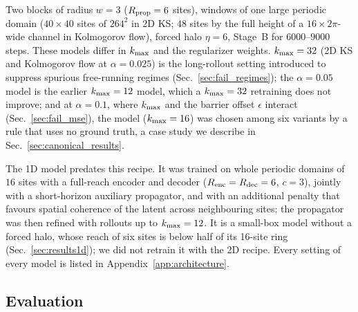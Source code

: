  Two blocks of radius $w=3$ ($R_{\mathrm{prop}}=6$ sites),
windows of one large periodic domain ($40\times40$ sites of $264^2$ in 2D
KS; $48$ sites by the full height of a $16\times2\pi$-wide channel in
Kolmogorov flow), forced halo $\eta=6$, Stage~B for $6000$--$9000$ steps.
These models differ in $k_{\max}$ and the regularizer weights. $k_{\max}=32$
(2D KS and Kolmogorov flow at $\alpha=0.025$) is the long-rollout setting
introduced to suppress spurious free-running regimes
(Sec.~\ref{sec:fail_regimes}); the $\alpha=0.05$ model is the earlier
$k_{\max}=12$ model, which a $k_{\max}=32$ retraining does not improve; and at
$\alpha=0.1$, where $k_{\max}$ and the barrier offset $\epsilon$ interact
(Sec.~\ref{sec:fail_mse}), the model ($k_{\max}=16$) was chosen among six
variants by a rule that uses no ground truth, a case study we describe
in Sec.~\ref{sec:canonical_results}.

The 1D model predates this recipe. It was trained on whole periodic
domains of $16$ sites with a full-reach encoder and decoder
($R_{\mathrm{enc}}=R_{\mathrm{dec}}=6$, $c=3$), jointly with a short-horizon auxiliary
propagator, and with an additional penalty that favours spatial
coherence of the latent across neighbouring sites; the propagator was
then refined with rollouts up to $k_{\max}=12$. It is a small-box model
without a forced halo, whose reach of six sites is below half of its
16-site ring (Sec.~\ref{sec:results1d}); we did not retrain it with the
2D recipe. Every setting of every model is listed in
Appendix~\ref{app:architecture}.

\subsection{Evaluation}
\label{sec:evaluation}

